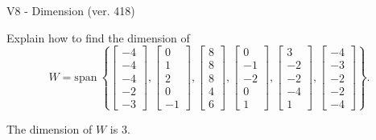 \begin{exercise}
  \begin{exerciseTitle}V8 - Dimension (ver. 418)\end{exerciseTitle}
  \begin{exerciseStatement}
    Explain how to find the dimension of 
\[W=\mathrm{span}\ \left\{\left[\begin{array}{r}
-4 \\
-4 \\
-4 \\
-2 \\
-3
\end{array}\right] , \left[\begin{array}{r}
0 \\
1 \\
2 \\
0 \\
-1
\end{array}\right] , \left[\begin{array}{r}
8 \\
8 \\
8 \\
4 \\
6
\end{array}\right] , \left[\begin{array}{r}
0 \\
-1 \\
-2 \\
0 \\
1
\end{array}\right] , \left[\begin{array}{r}
3 \\
-2 \\
-2 \\
-4 \\
1
\end{array}\right] , \left[\begin{array}{r}
-4 \\
-3 \\
-2 \\
-2 \\
-4
\end{array}\right]\right\}.\]



  \end{exerciseStatement}
  \begin{exerciseAnswer}
   The dimension of \(W\) is  \(3\).
  


  \end{exerciseAnswer}
\end{exercise}
